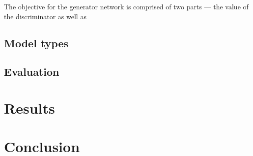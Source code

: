 \documentclass{llncs}
\begin{document}
The objective for the generator network is comprised of two parts --- the value of the discriminator as well as 









\subsection{Model types}

\subsection{Evaluation}

\section{Results}\label{results}



\section{Conclusion}\label{conclusion}



\clearpage


\end{document}
